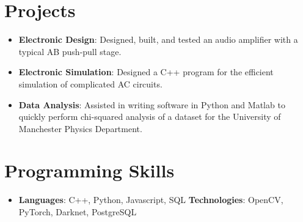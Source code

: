 \documentclass[letterpaper,11pt]{article}
\newcommand{\resumeItem}[2]{
  \item\small{
    \textbf{#1}{: #2 \vspace{-2pt}}
  }
}
\newcommand{\resumeSubItem}[2]{\resumeItem{#1}{#2}\vspace{-4pt}}
\newcommand{\resumeSubHeadingListStart}{\begin{itemize}[leftmargin=*]}
\newcommand{\resumeSubHeadingListEnd}{\end{itemize}}
\begin{document}
\section{Projects}
  \resumeSubHeadingListStart
    \resumeSubItem{Electronic Design}
      {Designed, built, and tested an audio amplifier with a typical AB push-pull stage.}
    \resumeSubItem{Electronic Simulation}
      {Designed a C++ program for the efficient simulation of complicated AC circuits.}
    \resumeSubItem{Data Analysis}
      {Assisted in writing software in Python and Matlab to quickly perform chi-squared analysis of a
      dataset for the University of Manchester Physics Department.}
  \resumeSubHeadingListEnd

%
\section{Programming Skills}
 \resumeSubHeadingListStart
   \item{
     \textbf{Languages}{: C++, Python, Javascript, SQL}
     \hfill
     \textbf{Technologies}{:  OpenCV, PyTorch, Darknet, PostgreSQL}
   }
 \resumeSubHeadingListEnd


\end{document}
